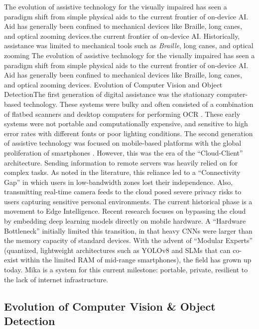 \documentclass[12pt,a4paper]{report}
\begin{document}
\noindent The evolution of assistive technology for the visually impaired has seen a paradigm shift from simple physical aids to the current frontier of on-device AI. Aid has generally been confined to mechanical devices like Braille, long canes, and optical zooming devices.the current frontier of on-device AI. Historically, assistance was limited to mechanical tools such as \textit{Braille}, long canes, and optical zooming The evolution of assistive technology for the visually impaired has seen a paradigm shift from simple physical aids to the current frontier of on-device AI. Aid has generally been confined to mechanical devices like Braille, long canes, and optical zooming devices.
\newline
\noindent Evolution of Computer Vision and Object DetectionThe first generation of digital assistance was the stationary computer-based technology. These systems were bulky and often consisted of a combination of flatbed scanners and desktop computers for performing OCR . These early systems were not portable and computationally expensive, and sensitive to high error rates with different fonts or poor lighting conditions.
\newline
\noindent The second generation of assistive technology was focused on mobile-based platforms with the global proliferation of smartphones . However, this was the era of the “Cloud-Client” architecture. Sending information to remote servers was heavily relied on for complex tasks. As noted in the literature, this reliance led to a “Connectivity Gap” in which users in low-bandwidth zones lost their independence. Also, transmitting real-time camera feeds to the cloud posed severe privacy risks to users capturing sensitive personal environments.
\newline
\noindent The current historical phase is a movement to Edge Intelligence. Recent research focuses on bypassing the cloud by embedding deep learning models directly on mobile hardware. A “Hardware Bottleneck” initially limited this transition, in that heavy CNNs were larger than the memory capacity of standard devices. With the advent of “Modular Experts” (quantized, lightweight architectures such as YOLOv8 and SLMs that can co-exist within the limited RAM of mid-range smartphones), the field has grown up today. Mika is a system for this current milestone: portable, private, resilient to the lack of internet infrastructure.

\subsection{Evolution of Computer Vision \& Object Detection}
 
\end{document}
